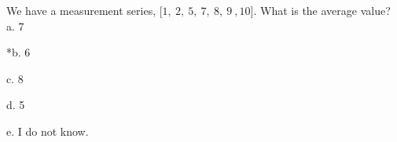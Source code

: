 
We have a measurement series,
\(\lbrack 1,\ 2,\ 5,\ 7,\ 8,\ 9\ ,10\rbrack\). What is the average value?\\

a. 7

*b. 6

c. 8

d. 5

e. I do not know.\\
